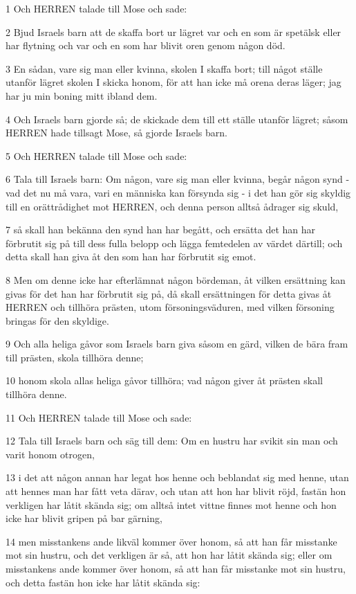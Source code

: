 \par 1 Och HERREN talade till Mose och sade:
\par 2 Bjud Israels barn att de skaffa bort ur lägret var och en som är spetälsk eller har flytning och var och en som har blivit oren genom någon död.
\par 3 En sådan, vare sig man eller kvinna, skolen I skaffa bort; till något ställe utanför lägret skolen I skicka honom, för att han icke må orena deras läger; jag har ju min boning mitt ibland dem.
\par 4 Och Israels barn gjorde så; de skickade dem till ett ställe utanför lägret; såsom HERREN hade tillsagt Mose, så gjorde Israels barn.
\par 5 Och HERREN talade till Mose och sade:
\par 6 Tala till Israels barn: Om någon, vare sig man eller kvinna, begår någon synd - vad det nu må vara, vari en människa kan försynda sig - i det han gör sig skyldig till en orättrådighet mot HERREN, och denna person alltså ådrager sig skuld,
\par 7 så skall han bekänna den synd han har begått, och ersätta det han har förbrutit sig på till dess fulla belopp och lägga femtedelen av värdet därtill; och detta skall han giva åt den som han har förbrutit sig emot.
\par 8 Men om denne icke har efterlämnat någon bördeman, åt vilken ersättning kan givas för det han har förbrutit sig på, då skall ersättningen för detta givas åt HERREN och tillhöra prästen, utom försoningsväduren, med vilken försoning bringas för den skyldige.
\par 9 Och alla heliga gåvor som Israels barn giva såsom en gärd, vilken de bära fram till prästen, skola tillhöra denne;
\par 10 honom skola allas heliga gåvor tillhöra; vad någon giver åt prästen skall tillhöra denne.
\par 11 Och HERREN talade till Mose och sade:
\par 12 Tala till Israels barn och säg till dem: Om en hustru har svikit sin man och varit honom otrogen,
\par 13 i det att någon annan har legat hos henne och beblandat sig med henne, utan att hennes man har fått veta därav, och utan att hon har blivit röjd, fastän hon verkligen har låtit skända sig; om alltså intet vittne finnes mot henne och hon icke har blivit gripen på bar gärning,
\par 14 men misstankens ande likväl kommer över honom, så att han får misstanke mot sin hustru, och det verkligen är så, att hon har låtit skända sig; eller om misstankens ande kommer över honom, så att han får misstanke mot sin hustru, och detta fastän hon icke har låtit skända sig:
